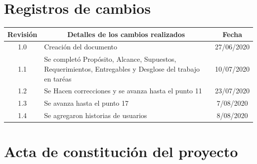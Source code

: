 \documentclass[11pt]{charter}
\begin{document}
\maketitle
\thispagestyle{empty}
\pagebreak


\thispagestyle{empty}
{\setlength{\parskip}{0pt}
\tableofcontents{}
}
\pagebreak


\section{Registros de cambios}
\label{sec:registro}


\begin{table}[ht]
\label{tab:registro}
\centering

\begin{tabularx}{\linewidth}{@{}|c|X|c|@{}}
\hline
\rowcolor[HTML]{C0C0C0} 
Revisión & \multicolumn{1}{c|}{\cellcolor[HTML]{C0C0C0}Detalles de los cambios realizados} & Fecha      \\ \hline

1.0      & Creación del documento          					& 27/06/2020 \\ \hline

1.1      & Se completó Propósito, Alcance, Supuestos, Requerimientos, Entregables y Desglose del trabajo en taréas 								& 10/07/2020 \\ \hline

1.2      & Se Hacen correcciones y se avanza hasta el punto 11 & 23/07/2020 \\ \hline

1.3      & Se avanza hasta el punto 17						 & 7/08/2020 \\ \hline

1.4      & Se agregaron historias de usuarios				 & 8/08/2020 \\ \hline


\end{tabularx}
\end{table}

\pagebreak



\section{Acta de constitución del proyecto}
\label{sec:acta}
\end{document}

